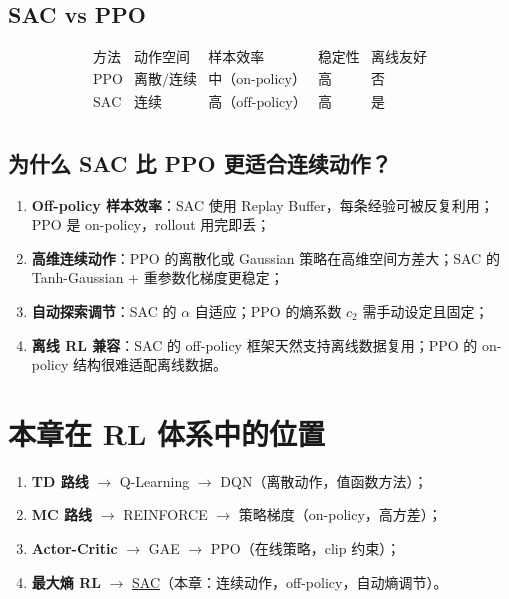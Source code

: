 \documentclass{article}
\begin{document}
\subsection*{SAC vs PPO}

\[
\begin{array}{c|c|c|c|c}
\text{方法} & \text{动作空间} & \text{样本效率} & \text{稳定性} & \text{离线友好} \\
\hline
\text{PPO} & \text{离散/连续} & \text{中（on-policy）}  & \text{高} & \text{否} \\
\text{SAC} & \text{连续}     & \text{高（off-policy）} & \text{高} & \text{是} \\
\end{array}
\]

\subsection*{为什么 SAC 比 PPO 更适合连续动作？}

\begin{enumerate}
  \item \textbf{Off-policy 样本效率}：SAC 使用 Replay Buffer，每条经验可被反复利用；PPO 是 on-policy，rollout 用完即丢；
  \item \textbf{高维连续动作}：PPO 的离散化或 Gaussian 策略在高维空间方差大；SAC 的 Tanh-Gaussian + 重参数化梯度更稳定；
  \item \textbf{自动探索调节}：SAC 的 $\alpha$ 自适应；PPO 的熵系数 $c_2$ 需手动设定且固定；
  \item \textbf{离线 RL 兼容}：SAC 的 off-policy 框架天然支持离线数据复用；PPO 的 on-policy 结构很难适配离线数据。
\end{enumerate}


\section*{本章在 RL 体系中的位置}

\begin{enumerate}
  \item \textbf{TD 路线} $\to$ Q-Learning $\to$ DQN（离散动作，值函数方法）；
  \item \textbf{MC 路线} $\to$ REINFORCE $\to$ 策略梯度（on-policy，高方差）；
  \item \textbf{Actor-Critic} $\to$ GAE $\to$ PPO（在线策略，clip 约束）；
  \item \textbf{最大熵 RL} $\to$ \underline{SAC}（本章：连续动作，off-policy，自动熵调节）。
\end{enumerate}
\end{document}
